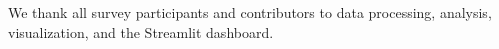 We thank all survey participants and contributors to data processing, analysis, visualization, and the Streamlit dashboard.
